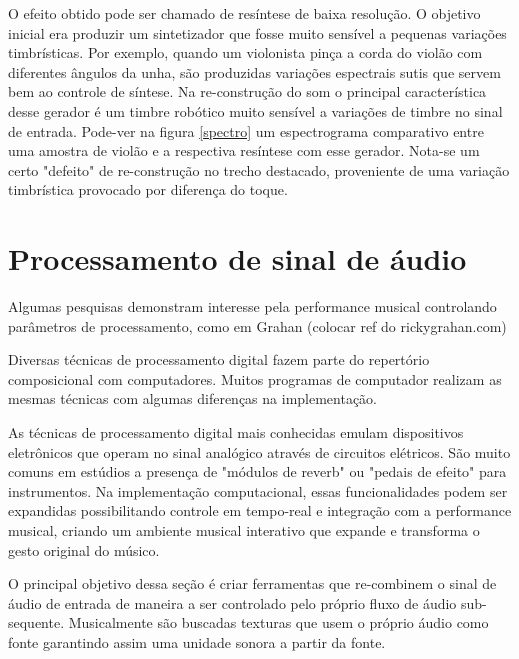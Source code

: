 \documentclass{ppgmus}
\begin{document}
O efeito obtido pode ser chamado de resíntese de baixa resolução. O objetivo
inicial era produzir um sintetizador que fosse muito sensível a pequenas
variações timbrísticas. Por exemplo, quando um violonista pinça a corda do violão
com diferentes ângulos da unha, são produzidas variações espectrais sutis que servem
bem ao controle de síntese. Na re-construção do som o principal característica desse
gerador é um timbre robótico muito sensível a variações de timbre no sinal de entrada.
Pode-ver na figura \ref{spectro} um espectrograma comparativo entre uma amostra
de violão e a respectiva resíntese com esse gerador. Nota-se um certo "defeito"
de re-construção no trecho destacado, proveniente de uma variação timbrística provocado
por diferença do toque. 




\pagebreak

\section{Processamento de sinal de áudio}


Algumas pesquisas demonstram interesse pela 
performance musical controlando parâmetros de processamento, como
em Grahan (colocar ref do rickygrahan.com)




Diversas técnicas de processamento digital fazem parte do repertório
composicional com computadores. Muitos programas de computador realizam
as mesmas técnicas com algumas diferenças na implementação.

As técnicas de processamento digital mais conhecidas emulam dispositivos
eletrônicos que operam no sinal analógico através de circuitos elétricos.
São muito comuns em estúdios a presença de "módulos de reverb" ou 
"pedais de efeito" para instrumentos. Na implementação computacional,
essas funcionalidades podem ser expandidas possibilitando controle em
tempo-real e integração com a performance musical, criando um ambiente
musical interativo que expande e transforma o gesto original do músico.

O principal objetivo dessa seção é criar ferramentas que re-combinem
o sinal de áudio de entrada de maneira a ser controlado pelo próprio
fluxo de áudio sub-sequente. Musicalmente são buscadas texturas que usem
o próprio áudio como fonte garantindo assim uma unidade sonora a partir da fonte.
\end{document}
